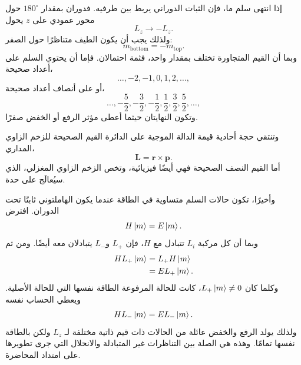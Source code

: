 \begin{classroomqa}
\end{classroomqa}

إذا انتهى سلم ما، فإن الثبات الدوراني يربط بين طرفيه. فدوران بمقدار \(180^\circ\) حول محور عمودي على \(z\) يحول
\begin{equation}
L_z\longrightarrow-L_z.
\end{equation}
ولذلك يجب أن يكون الطيف متناظرًا حول الصفر:
\begin{equation}
m_{\mathrm{bottom}}=-m_{\mathrm{top}}.
\end{equation}
وبما أن القيم المتجاورة تختلف بمقدار واحد، فثمة احتمالان. فإما أن يحتوي السلم على أعداد صحيحة،
\begin{equation}
\ldots,-2,-1,0,1,2,\ldots,
\end{equation}
أو على أنصاف أعداد صحيحة،
\begin{equation}
\ldots,-\frac{5}{2},-\frac{3}{2},-\frac{1}{2},
\frac{1}{2},\frac{3}{2},\frac{5}{2},\ldots,
\end{equation}
وتكون النهايتان حيثما أعطى مؤثر الرفع أو الخفض صفرًا.

وتنتقي حجة أحادية قيمة الدالة الموجية على الدائرة القيم الصحيحة للزخم الزاوي المداري،
\begin{equation}
\mathbf L=\mathbf r\times\mathbf p.
\end{equation}
أما القيم النصف الصحيحة فهي أيضًا فيزيائية، وتخص الزخم الزاوي المغزلي، الذي سيُعالَج على حدة.

وأخيرًا، تكون حالات السلم متساوية في الطاقة عندما يكون الهاملتوني ثابتًا تحت الدوران. افترض
\begin{equation}
H\left\lvert m\right\rangle=E\left\lvert m\right\rangle.
\end{equation}
وبما أن كل مركبة \(L_i\) تتبادل مع \(H\)، فإن \(L_+\) و\(L_-\) يتبادلان معه أيضًا. ومن ثم
\begin{align}
H L_+\left\lvert m\right\rangle
&=L_+H\left\lvert m\right\rangle\\
&=E L_+\left\lvert m\right\rangle.
\end{align}
وكلما كان \(L_+\left\lvert m\right\rangle\neq0\)، كانت للحالة المرفوعة الطاقة نفسها التي للحالة الأصلية. ويعطي الحساب نفسه
\begin{equation}
H L_-\left\lvert m\right\rangle=E L_-\left\lvert m\right\rangle.
\end{equation}
ولذلك يولد الرفع والخفض عائلة من الحالات ذات قيم ذاتية مختلفة لـ \(L_z\) ولكن بالطاقة نفسها تمامًا. وهذه هي الصلة بين التناظرات غير المتبادلة والانحلال التي جرى تطويرها على امتداد المحاضرة.

